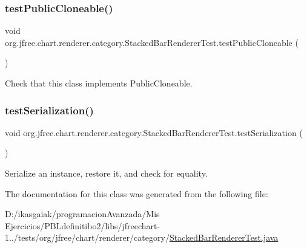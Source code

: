 \subsubsection{\texorpdfstring{test\+Public\+Cloneable()}{testPublicCloneable()}}
{\footnotesize\ttfamily void org.\+jfree.\+chart.\+renderer.\+category.\+Stacked\+Bar\+Renderer\+Test.\+test\+Public\+Cloneable (\begin{DoxyParamCaption}{ }\end{DoxyParamCaption})}

Check that this class implements Public\+Cloneable. \mbox{\label{classorg_1_1jfree_1_1chart_1_1renderer_1_1category_1_1_stacked_bar_renderer_test_a90b1f4609fc23d68f449e04eabe2b67c}} 
\subsubsection{\texorpdfstring{test\+Serialization()}{testSerialization()}}
{\footnotesize\ttfamily void org.\+jfree.\+chart.\+renderer.\+category.\+Stacked\+Bar\+Renderer\+Test.\+test\+Serialization (\begin{DoxyParamCaption}{ }\end{DoxyParamCaption})}

Serialize an instance, restore it, and check for equality. 

The documentation for this class was generated from the following file\+:\begin{DoxyCompactItemize}
\item 
D\+:/ikasgaiak/programacion\+Avanzada/\+Mis Ejercicios/\+P\+B\+Ldefinitibo2/libs/jfreechart-\/1../tests/org/jfree/chart/renderer/category/\mbox{\hyperlink{_stacked_bar_renderer_test_8java}{Stacked\+Bar\+Renderer\+Test.\+java}}\end{DoxyCompactItemize}
